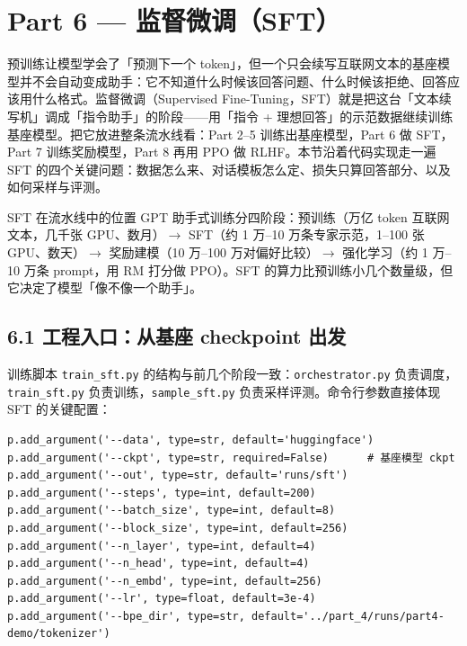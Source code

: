 \section{Part 6 — 监督微调（SFT）}

预训练让模型学会了「预测下一个 token」，但一个只会续写互联网文本的基座模型并不会自动变成助手：它不知道什么时候该回答问题、什么时候该拒绝、回答应该用什么格式。监督微调（Supervised Fine-Tuning，SFT）就是把这台「文本续写机」调成「指令助手」的阶段——用「指令 + 理想回答」的示范数据继续训练基座模型。把它放进整条流水线看：Part 2--5 训练出基座模型，Part 6 做 SFT，Part 7 训练奖励模型，Part 8 再用 PPO 做 RLHF。本节沿着代码实现走一遍 SFT 的四个关键问题：数据怎么来、对话模板怎么定、损失只算回答部分、以及如何采样与评测。

\begin{knowledgebox}{SFT 在流水线中的位置}
GPT 助手式训练分四阶段：预训练（万亿 token 互联网文本，几千张 GPU、数月）$\rightarrow$ SFT（约 1 万--10 万条专家示范，1--100 张 GPU、数天）$\rightarrow$ 奖励建模（10 万--100 万对偏好比较）$\rightarrow$ 强化学习（约 1 万--10 万条 prompt，用 RM 打分做 PPO）。SFT 的算力比预训练小几个数量级，但它决定了模型「像不像一个助手」。
\end{knowledgebox}

\subsection{6.1 工程入口：从基座 checkpoint 出发}

训练脚本 \texttt{train\_sft.py} 的结构与前几个阶段一致：\texttt{orchestrator.py} 负责调度，\texttt{train\_sft.py} 负责训练，\texttt{sample\_sft.py} 负责采样评测。命令行参数直接体现 SFT 的关键配置：

\begin{lstlisting}[caption={train\_sft.py 的主要命令行参数（按视频画面整理）}]
p.add_argument('--data', type=str, default='huggingface')
p.add_argument('--ckpt', type=str, required=False)      # 基座模型 ckpt
p.add_argument('--out', type=str, default='runs/sft')
p.add_argument('--steps', type=int, default=200)
p.add_argument('--batch_size', type=int, default=8)
p.add_argument('--block_size', type=int, default=256)
p.add_argument('--n_layer', type=int, default=4)
p.add_argument('--n_head', type=int, default=4)
p.add_argument('--n_embd', type=int, default=256)
p.add_argument('--lr', type=float, default=3e-4)
p.add_argument('--bpe_dir', type=str, default='../part_4/runs/part4-demo/tokenizer')
\end{lstlisting}

